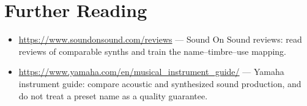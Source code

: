 \section*{Further Reading}
\begin{itemize}[leftmargin=1.5em]
\item \url{https://www.soundonsound.com/reviews} — Sound On Sound reviews: read reviews of comparable synths and train the name–timbre–use mapping.
\item \url{https://www.yamaha.com/en/musical_instrument_guide/} — Yamaha instrument guide: compare acoustic and synthesized sound production, and do not treat a preset name as a quality guarantee.
\end{itemize}
